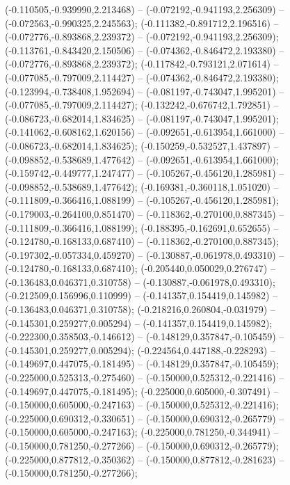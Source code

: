  (-0.110505,-0.939990,2.213468) -- (-0.072192,-0.941193,2.256309) -- (-0.072563,-0.990325,2.245563);
 (-0.111382,-0.891712,2.196516) -- (-0.072776,-0.893868,2.239372) -- (-0.072192,-0.941193,2.256309);
 (-0.113761,-0.843420,2.150506) -- (-0.074362,-0.846472,2.193380) -- (-0.072776,-0.893868,2.239372);
 (-0.117842,-0.793121,2.071614) -- (-0.077085,-0.797009,2.114427) -- (-0.074362,-0.846472,2.193380);
 (-0.123994,-0.738408,1.952694) -- (-0.081197,-0.743047,1.995201) -- (-0.077085,-0.797009,2.114427);
 (-0.132242,-0.676742,1.792851) -- (-0.086723,-0.682014,1.834625) -- (-0.081197,-0.743047,1.995201);
 (-0.141062,-0.608162,1.620156) -- (-0.092651,-0.613954,1.661000) -- (-0.086723,-0.682014,1.834625);
 (-0.150259,-0.532527,1.437897) -- (-0.098852,-0.538689,1.477642) -- (-0.092651,-0.613954,1.661000);
 (-0.159742,-0.449777,1.247477) -- (-0.105267,-0.456120,1.285981) -- (-0.098852,-0.538689,1.477642);
 (-0.169381,-0.360118,1.051020) -- (-0.111809,-0.366416,1.088199) -- (-0.105267,-0.456120,1.285981);
 (-0.179003,-0.264100,0.851470) -- (-0.118362,-0.270100,0.887345) -- (-0.111809,-0.366416,1.088199);
 (-0.188395,-0.162691,0.652655) -- (-0.124780,-0.168133,0.687410) -- (-0.118362,-0.270100,0.887345);
 (-0.197302,-0.057334,0.459270) -- (-0.130887,-0.061978,0.493310) -- (-0.124780,-0.168133,0.687410);
 (-0.205440,0.050029,0.276747) -- (-0.136483,0.046371,0.310758) -- (-0.130887,-0.061978,0.493310);
 (-0.212509,0.156996,0.110999) -- (-0.141357,0.154419,0.145982) -- (-0.136483,0.046371,0.310758);
 (-0.218216,0.260804,-0.031979) -- (-0.145301,0.259277,0.005294) -- (-0.141357,0.154419,0.145982);
 (-0.222300,0.358503,-0.146612) -- (-0.148129,0.357847,-0.105459) -- (-0.145301,0.259277,0.005294);
 (-0.224564,0.447188,-0.228293) -- (-0.149697,0.447075,-0.181495) -- (-0.148129,0.357847,-0.105459);
 (-0.225000,0.525313,-0.275460) -- (-0.150000,0.525312,-0.221416) -- (-0.149697,0.447075,-0.181495);
 (-0.225000,0.605000,-0.307491) -- (-0.150000,0.605000,-0.247163) -- (-0.150000,0.525312,-0.221416);
 (-0.225000,0.690312,-0.330651) -- (-0.150000,0.690312,-0.265779) -- (-0.150000,0.605000,-0.247163);
 (-0.225000,0.781250,-0.344941) -- (-0.150000,0.781250,-0.277266) -- (-0.150000,0.690312,-0.265779);
 (-0.225000,0.877812,-0.350362) -- (-0.150000,0.877812,-0.281623) -- (-0.150000,0.781250,-0.277266);
